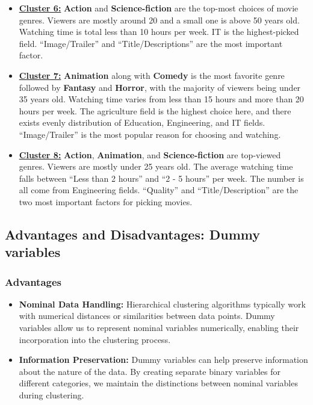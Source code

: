 \begin{itemize}
    \item \textbf{\underline{Cluster 6:}} \textbf{Action} and \textbf{Science-fiction} are the top-most choices of movie genres. Viewers are mostly around 20 and a small one is above 50 years old. Watching time is total less than 10 hours per week. IT is the highest-picked field. “Image/Trailer” and “Title/Descriptions” are the most important factor. 

    \item \textbf{\underline{Cluster 7:}} \textbf{Animation} along with \textbf{Comedy} is the most favorite genre followed by \textbf{Fantasy} and \textbf{Horror}, with the majority of viewers being under 35 years old. Watching time varies from less than 15 hours and more than 20 hours per week. The agriculture field is the highest choice here, and there exists evenly distribution of Education, Engineering, and IT fields. “Image/Trailer” is the most popular reason for choosing and watching.

    \item \textbf{\underline{Cluster 8:}} \textbf{Action}, \textbf{Animation}, and \textbf{Science-fiction} are top-viewed genres. Viewers are mostly under 25 years old. The average watching time falls between “Less than 2 hours” and “2 - 5 hours” per week. The number is all come from Engineering fields. “Quality” and “Title/Description” are the two most important factors for picking movies.
\end{itemize}

\subsection{Advantages and Disadvantages: Dummy variables}

    \subsubsection{Advantages}

        \begin{itemize}
            \item \textbf{Nominal Data Handling:} Hierarchical clustering algorithms typically work with numerical distances or similarities between data points. Dummy variables allow us to represent nominal variables numerically, enabling their incorporation into the clustering process.

            \item \textbf{Information Preservation:} Dummy variables can help preserve information about the nature of the data. By creating separate binary variables for different categories, we maintain the distinctions between nominal variables during clustering.
        \end{itemize}


